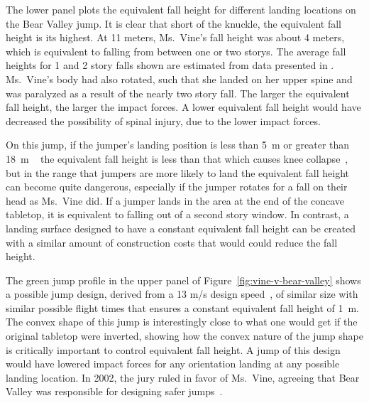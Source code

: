 \documentclass{article}
\begin{document}
The lower panel plots the equivalent fall height for different landing
locations on the Bear Valley jump. It is clear that short of the knuckle, the
equivalent fall height is its highest. At 11 meters, Ms.~Vine's fall height was
about 4 meters, which is equivalent to falling from between one or two storys.
The average fall heights for 1 and 2 story falls shown are estimated from data
presented in \cite{Vish2005}. ~ Ms.~Vine's body had also
rotated, such that she landed on her upper spine and was paralyzed as a result
of the nearly two story fall. The larger the equivalent fall height, the larger
the impact forces. A lower equivalent fall height would have decreased the
possibility of spinal injury, due to the lower impact forces.

On this jump, if the jumper's landing position is less than 5~\si{\meter} or
greater than 18~\si{\meter} ~ the equivalent fall height is less than that which causes knee
collapse~\cite{Minetti1998}, but in the range that jumpers are more likely to
land the equivalent fall height can become quite dangerous, especially if the
jumper rotates for a fall on their head as Ms.~Vine did. If a jumper lands in
the area at the end of the concave tabletop, it is equivalent to falling out of
a second story window. In contrast, a landing surface designed to have a
constant equivalent fall height can be created with a similar amount of
construction costs that would could reduce the fall height.

The green jump profile in the upper panel of
Figure~\ref{fig:vine-v-bear-valley} shows a possible jump design, derived from
a 13 m/s design speed~\cite{Levy2015}, of similar size with similar possible
flight times that ensures a constant equivalent fall height of 1~\si{\meter}.
The convex shape of this jump is interestingly close to what one would get if
the original tabletop were inverted, showing how the convex nature of the jump
shape is critically important to control equivalent fall height. A jump of this
design would have lowered impact forces for any orientation landing at any
possible landing location. In 2002, the jury ruled in favor of Ms.~Vine,
agreeing that Bear Valley was responsible for designing safer
jumps~\cite{Alvarado2002}.
\end{document}
